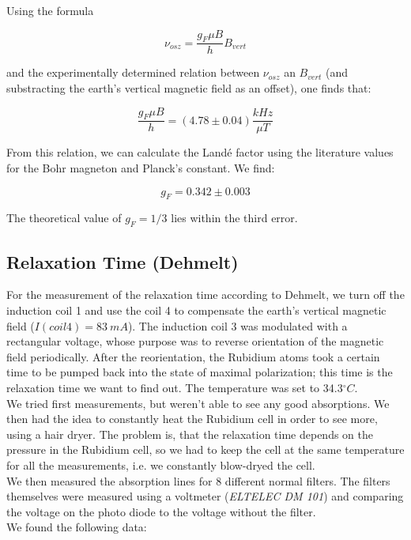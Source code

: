 Using the formula 

$$ \nu_{osz} = \frac{g_F\mu B}{h}B_{vert} $$

and the experimentally determined relation between $\nu_{osz}$ an $B_{vert}$ (and substracting the earth's  vertical magnetic field as an offset), one finds that:

$$\frac{g_F\mu B}{h} = (4.78\pm0.04)\frac{kHz}{\mu T}$$

From this relation, we can calculate the Landé factor using the literature values for the Bohr magneton and Planck's constant. We find:

$$g_F = 0.342 \pm 0.003$$

The theoretical value of $g_F = 1/3$ lies within the third error.



\subsection{Relaxation Time (Dehmelt)}

For the measurement of the relaxation time according to Dehmelt, we turn off the induction coil 1 and use the coil 4 to compensate the earth's vertical magnetic field ($I(coil4) = 83\ mA$). The induction coil 3 was modulated with a rectangular voltage, whose purpose was to reverse orientation of the magnetic field periodically. After the reorientation, the Rubidium atoms took a certain time to be pumped back into the state of maximal polarization; this time is the relaxation time we want to find out. The temperature was set to 34.3$^\circ C$.\\

We tried first measurements, but weren't able to see any good absorptions. We then had the idea to constantly heat the Rubidium cell in order to see more, using a hair dryer. The problem is, that the relaxation time depends on the pressure in the Rubidium cell, so we had to keep the cell at the same temperature for all the measurements, i.e. we constantly blow-dryed the cell.\\

We then measured the absorption lines for 8 different normal filters. The filters themselves were measured using a voltmeter (\emph{ELTELEC DM 101}) and comparing the voltage on the photo diode to the voltage without the filter.\\

We found the following data:

